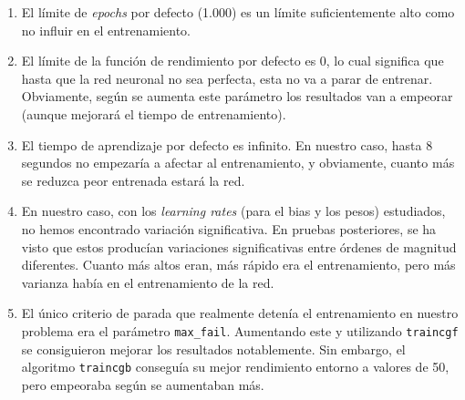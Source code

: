 \documentclass[a4paper,12pt,titlepage]{article}
\begin{document}
\begin{enumerate}[noitemsep]
	\item El límite de \textit{epochs} por defecto (1.000) es un límite suficientemente alto como no influir en el entrenamiento.
	\item El límite de la función de rendimiento por defecto es 0, lo cual significa que 			hasta que la red neuronal no sea perfecta, esta no va a parar de entrenar. Obviamente, según se aumenta este parámetro los resultados van a empeorar (aunque mejorará el tiempo de entrenamiento).
	\item El tiempo de aprendizaje por defecto es infinito. En nuestro caso, hasta 8 segundos no empezaría a afectar al entrenamiento, y obviamente, cuanto más se reduzca peor entrenada estará la red.
	\item En nuestro caso, con los \textit{learning rates} (para el bias y los pesos) estudiados, no hemos encontrado variación significativa. En pruebas posteriores, se ha visto que estos producían variaciones significativas entre órdenes de magnitud diferentes. Cuanto más altos eran, más rápido era el entrenamiento, pero más varianza había en el entrenamiento de la red.
	\item El único criterio de parada que realmente detenía el entrenamiento en nuestro problema era el parámetro \lstinline|max_fail|. Aumentando este y utilizando \lstinline|traincgf| se consiguieron mejorar los resultados notablemente. Sin embargo, el algoritmo \lstinline|traincgb| conseguía su mejor rendimiento entorno a valores de 50, pero empeoraba según se aumentaban más.
\end{enumerate}



\end{document}
